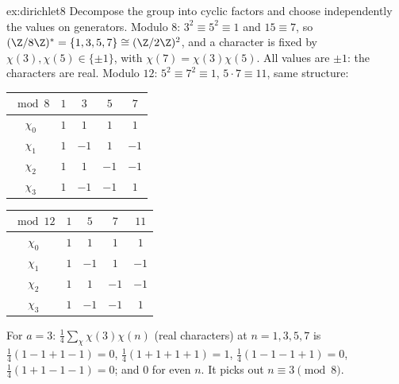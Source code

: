 \begin{solution}{ex:dirichlet8}
\idea Decompose the group into cyclic factors and choose independently the values on generators.
\writeup Modulo $8$: $3^2\equiv5^2\equiv1$ and $15\equiv7$, so $(\Z/8\Z)^*=\{1,3,5,7\}\cong(\Z/2\Z)^2$, and a character is fixed by $\chi(3),\chi(5)\in\{\pm1\}$, with $\chi(7)=\chi(3)\chi(5)$. All values are $\pm1$: the characters are real. Modulo $12$: $5^2\equiv7^2\equiv1$, $5\cdot7\equiv11$, same structure:
\begin{center}
\small
\begin{tabular}{c|cccc}
$\bmod8$ & $1$ & $3$ & $5$ & $7$\\\hline
$\chi_0$ & $1$ & $1$ & $1$ & $1$\\
$\chi_1$ & $1$ & $-1$ & $1$ & $-1$\\
$\chi_2$ & $1$ & $1$ & $-1$ & $-1$\\
$\chi_3$ & $1$ & $-1$ & $-1$ & $1$
\end{tabular}\qquad
\begin{tabular}{c|cccc}
$\bmod12$ & $1$ & $5$ & $7$ & $11$\\\hline
$\chi_0$ & $1$ & $1$ & $1$ & $1$\\
$\chi_1$ & $1$ & $-1$ & $1$ & $-1$\\
$\chi_2$ & $1$ & $1$ & $-1$ & $-1$\\
$\chi_3$ & $1$ & $-1$ & $-1$ & $1$
\end{tabular}
\end{center}
For $a=3$: $\frac14\sum_\chi\chi(3)\chi(n)$ (real characters) at $n=1,3,5,7$ is $\frac14(1-1+1-1)=0$, $\frac14(1+1+1+1)=1$, $\frac14(1-1-1+1)=0$, $\frac14(1+1-1-1)=0$; and $0$ for even $n$. It picks out $n\equiv3\pmod8$.
\end{solution}

